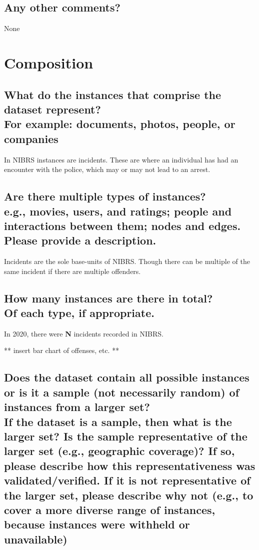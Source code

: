 \documentclass[letterpaper, 10 pt, conference]{ieeeconf}  %
\newcommand{\subtitle}[1]{{\\ \small \normalfont \color{purple} #1}}
\begin{document}
\subsection{Any other comments?}

None

\section{Composition}

\subsection{What do the instances that comprise the dataset represent? \subtitle{For example: documents, photos, people, or companies}}

In NIBRS instances are incidents. These are where an individual has had an encounter with the police, which may or may not lead to an arrest. 

\subsection{Are there multiple types of instances? \subtitle{e.g., movies, users, and ratings; people and interactions between them; nodes and edges. Please provide a description.}}

Incidents are the sole base-units of NIBRS. Though there can be multiple of the same incident if there are multiple offenders. 

\subsection{How many instances are there in total? \subtitle{Of each type, if appropriate.}}

In 2020, there were \textbf{N} incidents recorded in NIBRS. 

** insert bar chart of offenses, etc. **

\subsection{Does the dataset contain all possible instances or is it a sample (not necessarily random) of instances from a larger set? \subtitle{If the dataset is a sample, then what is the larger set? Is the sample representative of the larger set (e.g., geographic coverage)? If so, please describe how this representativeness was validated/verified. If it is not representative of the larger set, please describe why not (e.g., to cover a more diverse range of instances, because instances were withheld or unavailable)}}
\end{document}
